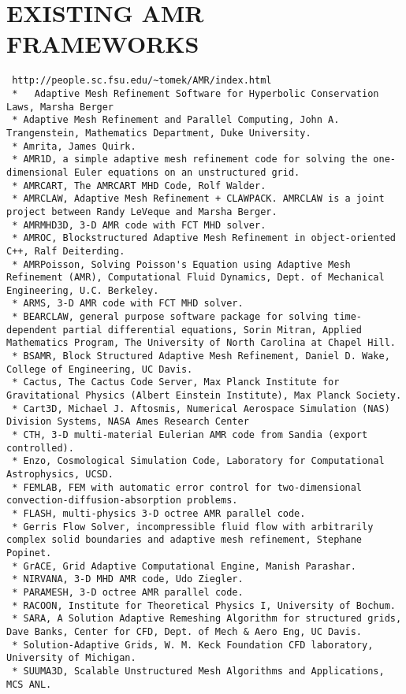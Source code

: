 \documentclass[14pt,letter]{article}
\begin{document}
\section{EXISTING AMR FRAMEWORKS} \label{s:review}

\begin{verbatim}
 http://people.sc.fsu.edu/~tomek/AMR/index.html
 *   Adaptive Mesh Refinement Software for Hyperbolic Conservation Laws, Marsha Berger
 * Adaptive Mesh Refinement and Parallel Computing, John A. Trangenstein, Mathematics Department, Duke University.
 * Amrita, James Quirk.
 * AMR1D, a simple adaptive mesh refinement code for solving the one-dimensional Euler equations on an unstructured grid.
 * AMRCART, The AMRCART MHD Code, Rolf Walder.
 * AMRCLAW, Adaptive Mesh Refinement + CLAWPACK. AMRCLAW is a joint project between Randy LeVeque and Marsha Berger.
 * AMRMHD3D, 3-D AMR code with FCT MHD solver.
 * AMROC, Blockstructured Adaptive Mesh Refinement in object-oriented C++, Ralf Deiterding.
 * AMRPoisson, Solving Poisson's Equation using Adaptive Mesh Refinement (AMR), Computational Fluid Dynamics, Dept. of Mechanical Engineering, U.C. Berkeley.
 * ARMS, 3-D AMR code with FCT MHD solver.
 * BEARCLAW, general purpose software package for solving time-dependent partial differential equations, Sorin Mitran, Applied Mathematics Program, The University of North Carolina at Chapel Hill.
 * BSAMR, Block Structured Adaptive Mesh Refinement, Daniel D. Wake, College of Engineering, UC Davis.
 * Cactus, The Cactus Code Server, Max Planck Institute for Gravitational Physics (Albert Einstein Institute), Max Planck Society.
 * Cart3D, Michael J. Aftosmis, Numerical Aerospace Simulation (NAS) Division Systems, NASA Ames Research Center
 * CTH, 3-D multi-material Eulerian AMR code from Sandia (export controlled).
 * Enzo, Cosmological Simulation Code, Laboratory for Computational Astrophysics, UCSD.
 * FEMLAB, FEM with automatic error control for two-dimensional convection-diffusion-absorption problems.
 * FLASH, multi-physics 3-D octree AMR parallel code.
 * Gerris Flow Solver, incompressible fluid flow with arbitrarily complex solid boundaries and adaptive mesh refinement, Stephane Popinet.
 * GrACE, Grid Adaptive Computational Engine, Manish Parashar.
 * NIRVANA, 3-D MHD AMR code, Udo Ziegler.
 * PARAMESH, 3-D octree AMR parallel code.
 * RACOON, Institute for Theoretical Physics I, University of Bochum.
 * SARA, A Solution Adaptive Remeshing Algorithm for structured grids, Dave Banks, Center for CFD, Dept. of Mech & Aero Eng, UC Davis.
 * Solution-Adaptive Grids, W. M. Keck Foundation CFD laboratory, University of Michigan.
 * SUUMA3D, Scalable Unstructured Mesh Algorithms and Applications, MCS ANL. 
\end{verbatim}
\end{document}
